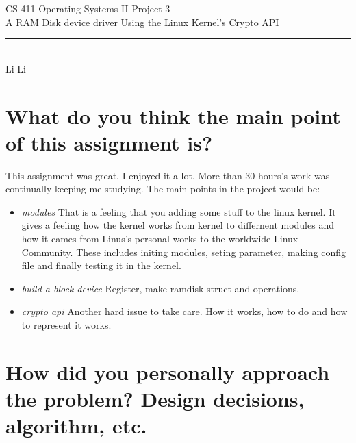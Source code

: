 \documentclass[12pt,letterpaper]{article}
\begin{document}
\begin{titlepage}
    \vspace*{4cm}
    \begin{flushleft}
    {\huge
        CS 411 Operating Systems II Project 3\\[.5cm]
    }
    {\large
        A RAM Disk device driver Using the Linux Kernel's Crypto API
    }
    \end{flushleft}
    \vfill
    \rule{5in}{.5mm}\\
    Li Li

\end{titlepage}
\section{What do you think the main point of this assignment is?}
\indent This assignment was great, I enjoyed it a lot. More than 30 hours's work was continually keeping me studying. The main points in the project would be:
\begin{itemize}
\item \emph{modules}  That is a feeling that you adding some stuff to the linux kernel. It gives a feeling how the kernel works from kernel to differnent modules and how it cames from Linus's personal works to the worldwide Linux Community. These includes initing modules, seting parameter, making config file and finally testing it in the kernel.
\item \emph{build a block device} Register, make ramdisk struct and operations.
\item \emph{crypto api} Another hard issue to take care. How it works, how to do and how to represent it works.
\end{itemize}


\section{How did you personally approach the problem? Design decisions, algorithm, etc.}
\end{document}
